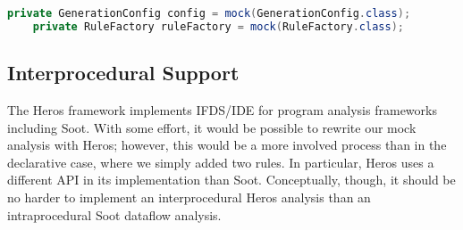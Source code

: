 

\begin{lstlisting}[basicstyle=\ttfamily, caption={Example for field mocks defined by field initializations from \texttt{TypeRuleTest.java} in jsonschema2pojo.},
basicstyle=\ttfamily,language = Java, framesep=4.5mm,
framexleftmargin=1mm, captionpos=b, label=lis:fieldMock]
	private GenerationConfig config = mock(GenerationConfig.class);
	private RuleFactory ruleFactory = mock(RuleFactory.class);
\end{lstlisting}

\subsection{Interprocedural Support} 

The Heros framework implements IFDS/IDE for program analysis frameworks including Soot. With some effort, it would be possible to rewrite our mock analysis with Heros; however, this would be a more involved process than in the declarative case, where we simply added two rules. In particular, Heros uses a different API in its implementation than Soot. Conceptually, though, it should be no harder to implement an interprocedural Heros analysis than an intraprocedural Soot dataflow analysis.


